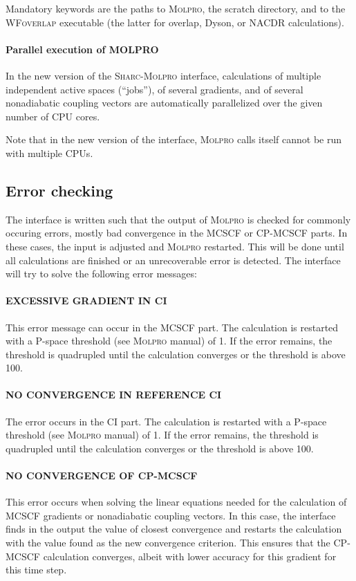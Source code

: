 \documentclass[a4paper,10pt,DIV=15,openany]{scrbook}
\newcommand{\sharc}{\textsc{Sharc}}
\begin{document}
Mandatory keywords are the paths to \textsc{Molpro}, the scratch directory, and to the \textsc{WFoverlap} executable (the latter for overlap, Dyson, or NACDR calculations).

\paragraph{Parallel execution of MOLPRO}

In the new version of the \sharc-\textsc{Molpro} interface, calculations of multiple independent active spaces (``jobs''), of several gradients, and of several nonadiabatic coupling vectors are automatically parallelized over the given number of CPU cores.

Note that in the new version of the interface, \textsc{Molpro} calls itself cannot be run with multiple CPUs.


\subsection{Error checking}

The interface is written such that the output of \textsc{Molpro} is checked for commonly occuring errors, mostly bad convergence in the MCSCF or CP-MCSCF parts. In these cases, the input is adjusted and \textsc{Molpro} restarted. This will be done until all calculations are finished or an unrecoverable error is detected.
The interface will try to solve the following error messages:

\paragraph{EXCESSIVE GRADIENT IN CI} This error message can occur in the MCSCF part. The calculation is restarted with a P-space threshold (see \textsc{Molpro} manual) of 1. If the error remains, the threshold is quadrupled until the calculation converges or the threshold is above 100.

\paragraph{NO CONVERGENCE IN REFERENCE CI} The error occurs in the CI part. The calculation is restarted with a P-space threshold (see \textsc{Molpro} manual) of 1. If the error remains, the threshold is quadrupled until the calculation converges or the threshold is above 100.

\paragraph{NO CONVERGENCE OF CP-MCSCF} This error occurs when solving the linear equations needed for the calculation of MCSCF gradients or nonadiabatic coupling vectors. In this case, the interface finds in the output the value of closest convergence and restarts the calculation with the value found as the new convergence criterion. This ensures that the CP-MCSCF calculation converges, albeit with lower accuracy for this gradient for this time step.
\end{document}
